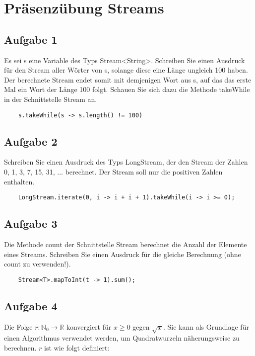 \chapter{Präsenzübung Streams}

\section{Aufgabe 1}

Es sei s eine Variable des Typs Stream<String>.
Schreiben Sie einen Ausdruck für den Stream aller Wörter von s, solange diese eine Länge ungleich
100 haben. Der berechnete Stream endet somit mit demjenigen Wort aus s, auf das das erste Mal
ein Wort der Länge 100 folgt.
Schauen Sie sich dazu die Methode takeWhile in der Schnittstelle Stream an.

\begin{lstlisting}
    s.takeWhile(s -> s.length() != 100)
\end{lstlisting}

\section{Aufgabe 2}

Schreiben Sie einen Ausdruck des Typs LongStream, der den Stream der Zahlen 0, 1, 3, 7, 15, 31,
... berechnet. Der Stream soll nur die positiven Zahlen enthalten.

\begin{lstlisting}
    LongStream.iterate(0, i -> i + i + 1).takeWhile(i -> i >= 0);
\end{lstlisting}

\section{Aufgabe 3}

Die Methode count der Schnittstelle Stream berechnet die Anzahl der Elemente eines Streams.
Schreiben Sie einen Ausdruck für die gleiche Berechnung (ohne count zu verwenden!).

\begin{lstlisting}
    Stream<T>.mapToInt(t -> 1).sum();
\end{lstlisting}

\section{Aufgabe 4}

Die Folge $r: \mathbb{N}_0 \rightarrow \mathbb{R}$ konvergiert für $x \geq 0$ gegen $\sqrt{x}$. Sie kann als Grundlage für einen Algorithmus
verwendet werden, um Quadratwurzeln näherungsweise zu berechnen. $r$ ist wie folgt definiert:

